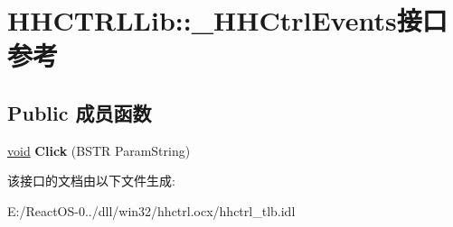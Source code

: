 \hypertarget{interface_h_h_c_t_r_l_lib_1_1___h_h_ctrl_events}{}\section{H\+H\+C\+T\+R\+L\+Lib\+:\+:\+\_\+\+H\+H\+Ctrl\+Events接口 参考}
\label{interface_h_h_c_t_r_l_lib_1_1___h_h_ctrl_events}
\subsection*{Public 成员函数}
\begin{DoxyCompactItemize}
\item 
\mbox{\label{interface_h_h_c_t_r_l_lib_1_1___h_h_ctrl_events_a0f12a0c0ba91cc5a327ec63f3a7bcaa7}} 
\hyperlink{interfacevoid}{void} {\bfseries Click} (B\+S\+TR Param\+String)
\end{DoxyCompactItemize}


该接口的文档由以下文件生成\+:\begin{DoxyCompactItemize}
\item 
E\+:/\+React\+O\+S-\/0../dll/win32/hhctrl.\+ocx/hhctrl\+\_\+tlb.\+idl\end{DoxyCompactItemize}
